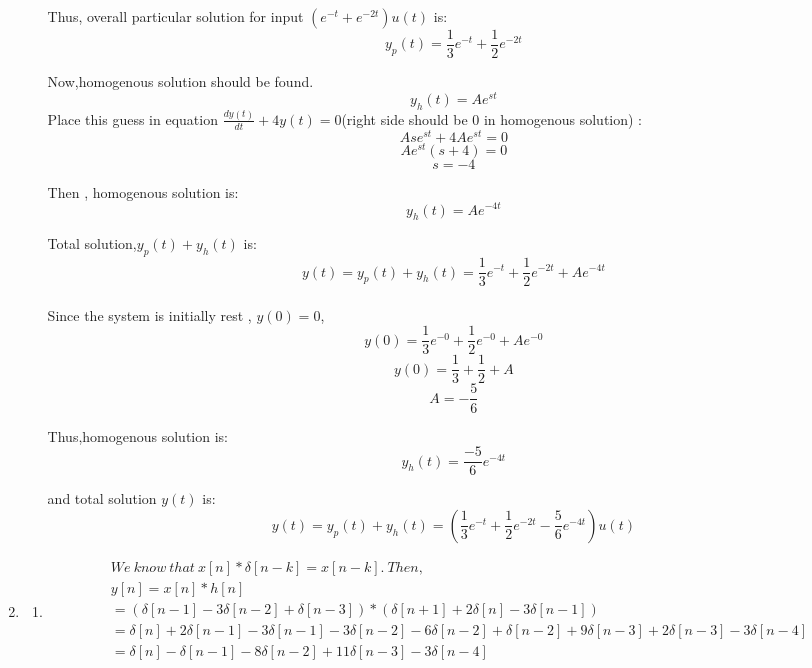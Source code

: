 \documentclass[10pt,a4paper, margin=1in]{article}
\begin{document}
\begin{enumerate}
\begin{enumerate}
    Thus, overall particular solution for input $(e^{-t}+e^{-2t})u(t)$ is:\\
    \[ y_p(t) = \frac{1}{3} e^{-t}+ \frac{1}{2} e^{-2t} \]
    
    Now,homogenous solution should be found.\\
    \[ y_h(t) = Ae^{st} \]
     Place this guess in equation $\frac{dy(t)}{dt}+4y(t)= 0$(right side should be 0 in homogenous solution) :
     \[ Ase^{st}+4Ae^{st} = 0 \]
     \[ Ae^{st}(s+4) = 0 \]
     \[ s = -4 \]
     
     Then , homogenous solution is:
     \[ y_h(t) = Ae^{-4t} \]
     
     Total solution,$y_p(t)+y_h(t)$ is:
     \[ y(t)=y_p(t)+y_h(t) = \frac{1}{3} e^{-t}+ \frac{1}{2} e^{-2t}+Ae^{-4t} \]
     \\
     Since the system is initially rest , $y(0)= 0$,
     \[ y(0)= \frac{1}{3} e^{-0}+ \frac{1}{2} e^{-0}+Ae^{-0} \]
     \[ y(0)= \frac{1}{3}+ \frac{1}{2} +A \]
     \[ A= -\frac{5}{6} \]
     
     Thus,homogenous solution is:
     \[ y_h(t) = \frac{-5}{6}e^{-4t} \]
     
     and total solution $y(t)$ is:
      \[ y(t)=y_p(t)+y_h(t) = (\frac{1}{3} e^{-t}+ \frac{1}{2} e^{-2t}-\frac{5}{6}e^{-4t})u(t) \]

    \end{enumerate}


\item %
	\begin{enumerate}
    \item %
    \begin{align*}
    & We \ know \ that \ x[n]*\delta[n-k] = x[n-k]. \ Then, \\
    &y[n] = x[n]*h[n] \\
    &= (\delta[n-1] - 3\delta[n-2] + \delta[n-3])*(\delta[n+1] + 2\delta[n] - 3\delta[n-1]) \\
    & = \delta[n] + 2\delta[n-1] -3\delta[n-1] - 3\delta[n-2] -6\delta[n-2] +\delta[n-2] + 9\delta[n-3] + 2\delta[n-3] - 3\delta[n-4] \\
    & = \delta[n] -\delta[n-1] -8\delta[n-2] +11\delta[n-3] -3\delta[n-4] \\
    \end{align*}
    

\end{enumerate}
\end{enumerate}
\end{document}
